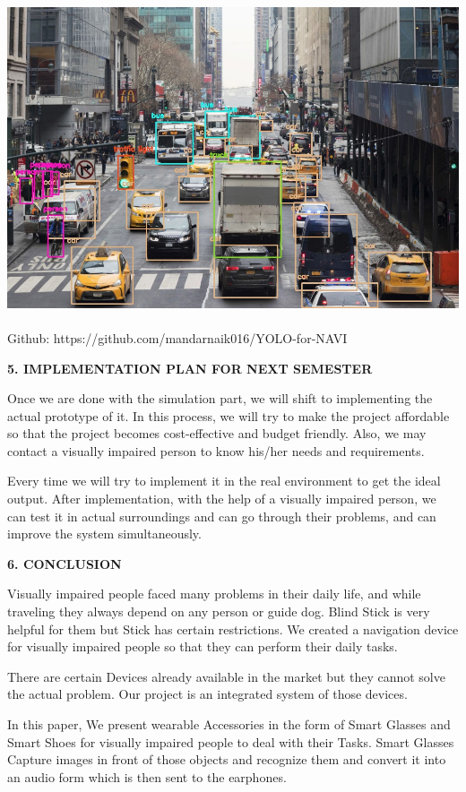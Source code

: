 \documentclass{article}
\begin{document}
\includegraphics[width=5.41667in,height=3.60764in]{media/16.jpg}

Github: {https://github.com/mandarnaik016/YOLO-for-NAVI}

\textbf{5. IMPLEMENTATION PLAN FOR NEXT SEMESTER}

Once we are done with the simulation part, we will shift to implementing
the actual prototype of it. In this process, we will try to make the
project affordable so that the project becomes cost-effective and budget
friendly. Also, we may contact a visually impaired person to know
his/her needs and requirements.

Every time we will try to implement it in the real environment to get
the ideal output. After implementation, with the help of a visually
impaired person, we can test it in actual surroundings and can go
through their problems, and can improve the system simultaneously.

\textbf{6. CONCLUSION}

Visually impaired people faced many problems in their daily life, and
while traveling they always depend on any person or guide dog. Blind
Stick is very helpful for them but Stick has certain restrictions. We
created a navigation device for visually impaired people so that they
can perform their daily tasks.

There are certain Devices already available in the market but they
cannot solve the actual problem. Our project is an integrated system of
those devices.

In this paper, We present wearable Accessories in the form of Smart
Glasses and Smart Shoes for visually impaired people to deal with their
Tasks. Smart Glasses Capture images in front of those objects and
recognize them and convert it into an audio form which is then sent to
the earphones.
\end{document}
